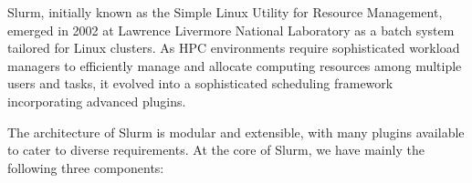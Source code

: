 
Slurm, initially known as the Simple Linux Utility for Resource Management, emerged in 2002 at Lawrence Livermore National Laboratory as a batch system tailored for Linux clusters. As HPC environments require sophisticated workload managers to efficiently manage and allocate computing resources among multiple users and tasks, it evolved into a sophisticated scheduling framework incorporating advanced plugins.



The architecture of Slurm is modular and extensible, with many plugins available to cater to diverse requirements. At the core of Slurm, we have mainly the following three components:

